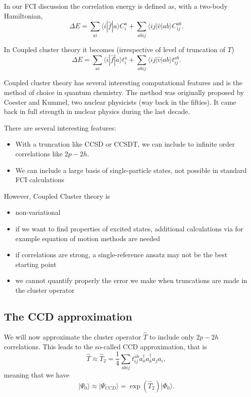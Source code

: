 \noindent


In our FCI discussion the correlation energy is defined as, with a two-body Hamiltonian,  
\[
\Delta E=\sum_{ai}\langle i| \hat{f}|a \rangle C_{i}^{a}+
\sum_{abij}\langle ij | \hat{v}| ab \rangle C_{ij}^{ab}.
\]

In Coupled cluster theory it becomes (irrespective of level of truncation of $T$)
\[
\Delta E=\sum_{ai}\langle i| \hat{f}|a \rangle t_{i}^{a}+
\sum_{abij}\langle ij | \hat{v}| ab \rangle t_{ij}^{ab}.
\]

Coupled cluster theory has several interesting computational features
and is the method of choice in quantum chemistry. The method was
originally proposed by Coester and Kummel, two nuclear physicists (way
back in the fifties). It came back in full strength in nuclear physics
during the last decade.

There are several interesting features:
\begin{itemize}
\item With a truncation like CCSD or CCSDT, we can include to infinite order correlations like $2p-2h$.

\item We can include a large basis of single-particle states, not possible in standard FCI calculations
\end{itemize}

\noindent
However, Coupled Cluster theory is
\begin{itemize}
\item non-variational

\item if we want to find properties of excited states, additional calculations via for example equation of motion methods are needed

\item if correlations are strong, a single-reference ansatz may not be the best starting point

\item we cannot quantify properly the error we make when truncations are made in the cluster operator
\end{itemize}

\noindent
\subsection{The CCD approximation}

We will now approximate the cluster operator $\hat{T}$ to include only
$2p-2h$ correlations. This leads to the so-called CCD approximation,
that is
\[
\hat{T}\approx \hat{T}_2=\frac{1}{4}\sum_{abij}t_{ij}^{ab}a^{\dagger}_aa^{\dagger}_ba_ja_i,
\]
meaning that we have
\[
\vert \Psi_0 \rangle \approx \vert \Psi_{CCD} \rangle = \exp{\left(\hat{T}_2\right)}\vert \Phi_0\rangle.
\]

